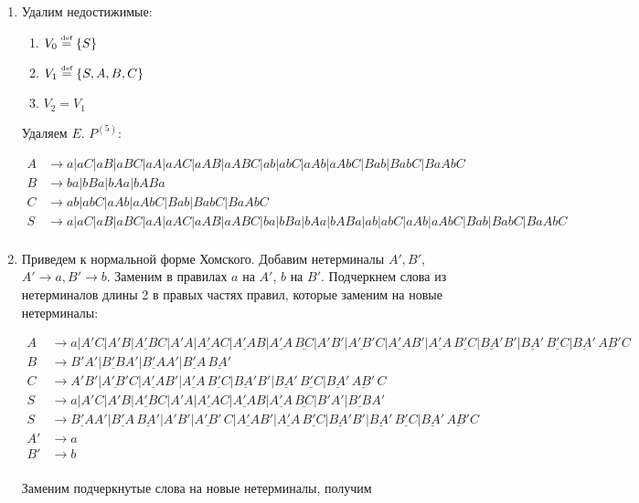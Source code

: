 \documentclass[a4paper]{article}
\def\eqdef{\overset{\mbox{\tiny def}}{=}}
\begin{document}
\begin{enumerate}
\item Удалим недостижимые:\begin{enumerate}
\item $V_0\eqdef\{S\}$
\item $V_1\eqdef\{S,A,B,C\}$
\item $V_2=V_1$
\end{enumerate}
Удаляем $E$. $P^{(5)}$:
\vspace{-7ex}
\begin{multicols}{2}
	\begin{align*}
		A &\to a|aC|aB|aBC|aA|aAC|aAB|aABC|ab|abC|aAb|aAbC|Bab|BabC|BaAbC\\
		B &\to ba|bBa|bAa|bABa\\
		C &\to ab|abC|aAb|aAbC|Bab|BabC|BaAbC\\
		S &\to a|aC|aB|aBC|aA|aAC|aAB|aABC|ba|bBa|bAa|bABa|ab|abC|aAb|aAbC|Bab|BabC|BaAbC\\
	\end{align*}	
\end{multicols}
\vspace{-7ex}
\item Приведем к нормальной форме Хомского. Добавим нетерминалы $A',B'$, $A'\to a,B'\to b$. Заменим в правилах $a$ на $A'$, $b$ на $B'$. Подчеркнем слова из нетерминалов длины 2 в правых частях правил, которые заменим на новые нетерминалы:
\vspace{-7ex}
\begin{multicols}{2}
	\begin{align*}
		A &\to a|A'C|A'B|\underline{A'B}C|A'A|\underline{A'A}C|\underline{A'A}B|\underline{A'A}\,\underline{BC}|A'B'|\underline{A'B'}C|\underline{A'A}B'|\underline{A'A}\,\underline{B'C}|\underline{BA'}B'|\underline{BA'}\,\underline{B'C}|\underline{BA'}\,\underline{AB'}C\\
		B &\to B'A'|\underline{B'B}A'|\underline{B'A}A'|\underline{B'A}\,\underline{BA'}\\
		C &\to A'B'|\underline{A'B'}C|\underline{A'A}B'|\underline{A'A}\,\underline{B'C}|\underline{BA'}B'|\underline{BA'}\,\underline{B'C}|\underline{BA'}\,\underline{AB'}\,C\\
		S &\to a|A'C|A'B|\underline{A'B}C|A'A|\underline{A'A}C|\underline{A'A}B|\underline{A'A}\,\underline{BC}|B'A'|\underline{B'B}A'\\
		S &\to \underline{B'A}A'|\underline{B'A}\,\underline{BA'}|A'B'|\underline{A'B'}\,C|\underline{A'A}B'|\underline{A'A}\,\underline{B'C}|\underline{BA'}B'|\underline{BA'}\,\underline{B'C}|\underline{BA'}\,\underline{AB'}C\\			
		A' &\to a\\
		B' &\to b\\
	\end{align*}	
\end{multicols}
\vspace{-7ex}
Заменим подчеркнутые слова на новые нетерминалы, получим
\end{enumerate}
\end{document}
